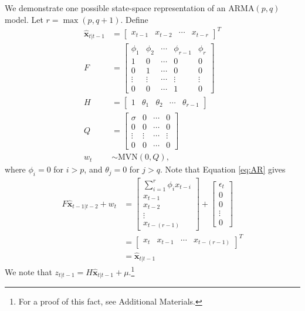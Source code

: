 We demonstrate one possible state-space representation of an $\text{ARMA}(p,q)$ model. Let
$r = \max(p, q+1)$. Define
\begin{align}
    \hat{\textbf{x}}_{t|t-1}&=\begin{bmatrix}x_{t-1}&x_{t-2}&\dotsb&x_{t-r}\end{bmatrix}^T\\
    F &= \begin{bmatrix}
        \phi_1 & \phi_2 & \cdots & \phi_{r-1} & \phi_r\\
        1 & 0 & \cdots & 0 & 0\\
        0 & 1 & \cdots & 0 & 0\\
        \vdots & \vdots & \cdots & \vdots & \vdots\\
        0 & 0 & \cdots & 1 & 0
    \end{bmatrix}\\
    H &= \begin{bmatrix}
        1 & \theta_1 & \theta_2 & \cdots & \theta_{r-1}
    \end{bmatrix}\\
    Q &= \begin{bmatrix}
        \sigma & 0 & \cdots & 0\\
        0 & 0 & \cdots & 0\\
        \vdots & \vdots & \cdots & \vdots\\
        0 & 0 & \cdots & 0
    \end{bmatrix}\\
    w_t &\sim \text{MVN}(0, Q),
    \label{eqn:error}
\end{align}
where $\phi_i = 0$ for $i>p$, and $\theta_j = 0$ for $j > q$.
Note that Equation \ref{eq:AR} gives
\begin{align}
    F\hat{\textbf{x}}_{t-1|t-2}+w_{t}&=\begin{bmatrix}\sum_{i=1}^r\phi_ix_{t-i}\\
                                x_{t-1}\\
                                x_{t-2}\\
                                \vdots\\
                                x_{t-(r-1)}
                  \end{bmatrix}+\begin{bmatrix}\epsilon_t\\0\\0\\\vdots\\0\end{bmatrix}\\
                &=\begin{bmatrix}x_t&x_{t-1}&\cdots&x_{t-(r-1)}\end{bmatrix}^T\\
                &=\hat{\textbf{x}}_{t|t-1}
\end{align}
We note that $z_{t|t-1}=H\hat{\textbf{x}}_{t|t-1}+\mu$.\footnote{
For a proof of this fact, see Additional Materials.}


